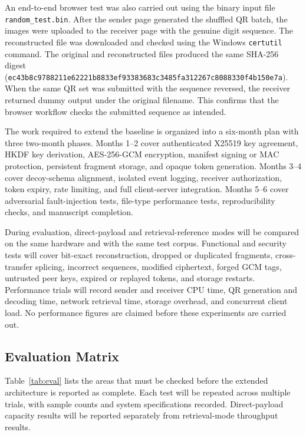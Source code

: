 \documentclass[conference]{IEEEtran}
\begin{document}
An end-to-end browser test was also carried out using the binary input file \texttt{random\_test.bin}. After the sender page generated the shuffled QR batch, the images were uploaded to the receiver page with the genuine digit sequence. The reconstructed file was downloaded and checked using the Windows \texttt{certutil} command. The original and reconstructed files produced the same SHA-256 digest (\texttt{ec43b8c9}\allowbreak\texttt{788211e6}\allowbreak\texttt{2221b883}\allowbreak\texttt{3ef93383}\allowbreak\texttt{683c3485}\allowbreak\texttt{fa312267}\allowbreak\texttt{c8088330}\allowbreak\texttt{f4b150e7}\allowbreak\texttt{a}). When the same QR set was submitted with the sequence reversed, the receiver returned dummy output under the original filename. This confirms that the browser workflow checks the submitted sequence as intended.

The work required to extend the baseline is organized into a six-month plan with three two-month phases. Months 1--2 cover authenticated X25519 key agreement, HKDF key derivation, AES-256-GCM encryption, manifest signing or MAC protection, persistent fragment storage, and opaque token generation. Months 3--4 cover decoy-schema alignment, isolated event logging, receiver authorization, token expiry, rate limiting, and full client-server integration. Months 5--6 cover adversarial fault-injection tests, file-type performance tests, reproducibility checks, and manuscript completion.

During evaluation, direct-payload and retrieval-reference modes will be compared on the same hardware and with the same test corpus. Functional and security tests will cover bit-exact reconstruction, dropped or duplicated fragments, cross-transfer splicing, incorrect sequences, modified ciphertext, forged GCM tags, untrusted peer keys, expired or replayed tokens, and storage restarts. Performance trials will record sender and receiver CPU time, QR generation and decoding time, network retrieval time, storage overhead, and concurrent client load. No performance figures are claimed before these experiments are carried out.

\subsection{Evaluation Matrix}
Table~\ref{tab:eval} lists the areas that must be checked before the extended architecture is reported as complete. Each test will be repeated across multiple trials, with sample counts and system specifications recorded. Direct-payload capacity results will be reported separately from retrieval-mode throughput results.
\end{document}
